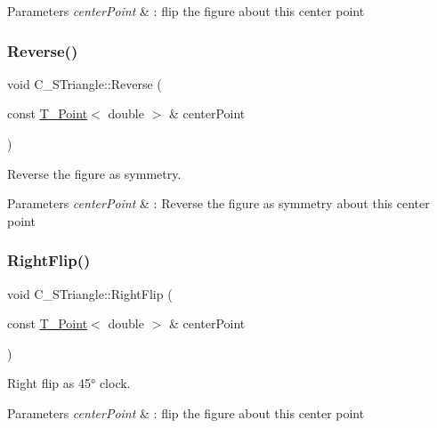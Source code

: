 \begin{DoxyParams}{Parameters}
{\em center\+Point} & \+: flip the figure about this center point \\
\hline
\end{DoxyParams}
\mbox{\label{classC__STriangle_a3fafeed75d888024e95a494b8901e8fe}} 
\subsubsection{\texorpdfstring{Reverse()}{Reverse()}}
{\footnotesize\ttfamily void C\+\_\+\+S\+Triangle\+::\+Reverse (\begin{DoxyParamCaption}\item[{const \hyperlink{classT__Point}{T\+\_\+\+Point}$<$ double $>$ \&}]{center\+Point }\end{DoxyParamCaption})}



Reverse the figure as symmetry. 


\begin{DoxyParams}{Parameters}
{\em center\+Point} & \+: Reverse the figure as symmetry about this center point \\
\hline
\end{DoxyParams}
\mbox{\label{classC__STriangle_ad84c7c6c2a4ca6d2fd3a681fd6dfcf63}} 
\subsubsection{\texorpdfstring{Right\+Flip()}{RightFlip()}}
{\footnotesize\ttfamily void C\+\_\+\+S\+Triangle\+::\+Right\+Flip (\begin{DoxyParamCaption}\item[{const \hyperlink{classT__Point}{T\+\_\+\+Point}$<$ double $>$ \&}]{center\+Point }\end{DoxyParamCaption})}



Right flip as 45° clock. 


\begin{DoxyParams}{Parameters}
{\em center\+Point} & \+: flip the figure about this center point \\
\hline
\end{DoxyParams}
\mbox{\label{classC__STriangle_afe6a1fcb5bf97792dd38e698bb6ad0cd}} 
